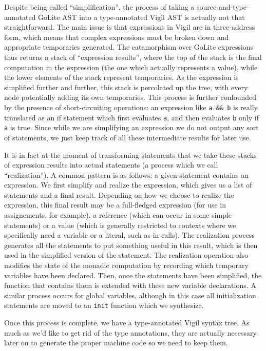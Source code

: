 \documentclass[letterpaper,11pt]{article}
\begin{document}
Despite being called ``simplification'', the process of taking a source-and-type-annotated GoLite AST into a type-annotated Vigil AST is actually not that straightforward. The main issue is that expressions in Vigil are in three-address form, which means that complex expressions must be broken down and appropriate temporaries generated. The catamorphism over GoLite expressions thus returns a stack of ``expression results'', where the top of the stack is the final computation in the expression (the one which actually represents a value), while the lower elements of the stack represent temporaries. As the expression is simplified further and further, this stack is percolated up the tree, with every node potentially adding its own temporaries. This process is further confounded by the presence of short-circuiting operations: an expression like \texttt{a \&\& b} is really translated as an if statement which first evaluates \texttt{a}, and then evaluates \texttt{b} only if \texttt{a} is true. Since while we are simplifying an expression we do not output any sort of statements, we just keep track of all these intermediate results for later use.

It is in fact at the moment of transforming statements that we take these stacks of expression results into actual statements (a process which we call ``realization''). A common pattern is as follows: a given statement contains an expression. We first simplify and realize the expression, which gives us a list of statements and a final result. Depending on how we choose to realize the expression, this final result may be a full-fledged expression (for use in assignements, for example), a reference (which can occur in some simple statements) or a value (which is generally restricted to contexts where we specifically need a variable or a literal, such as in calls). The realization process generates all the statements to put something useful in this result, which is then used in the simplified version of the statement. The realization operation also modifies the state of the monadic computation by recording which temporary variables have been declared. Then, once the statements have been simplified, the function that contains them is extended with these new variable declarations. A similar process occurs for global variables, although in this case all initialization statements are moved to an \texttt{init} function which we synthesize.

Once this process is complete, we have a type-annotated Vigil syntax tree. As much as we'd like to get rid of the type annotations, they are actually necessary later on to generate the proper machine code so we need to keep them.
\end{document}
